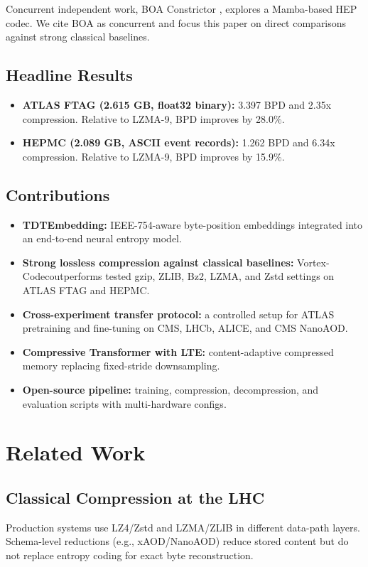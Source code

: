\documentclass[10pt,twocolumn]{article}
\newcommand{\codec}{Vortex-Codec}
\begin{document}
Concurrent independent work, BOA Constrictor \cite{boa_constrictor}, explores a Mamba-based HEP codec. We cite BOA as concurrent and focus this paper on direct comparisons against strong classical baselines.

\subsection{Headline Results}
\begin{itemize}[leftmargin=1.2em,itemsep=2pt]
  \item \textbf{ATLAS FTAG (2.615 GB, float32 binary):} 3.397 BPD and 2.35x compression. Relative to LZMA-9, BPD improves by 28.0\%.
  \item \textbf{HEPMC (2.089 GB, ASCII event records):} 1.262 BPD and 6.34x compression. Relative to LZMA-9, BPD improves by 15.9\%.
\end{itemize}

\subsection{Contributions}
\begin{itemize}[leftmargin=1.2em,itemsep=2pt]
  \item \textbf{TDTEmbedding:} IEEE-754-aware byte-position embeddings integrated into an end-to-end neural entropy model.
  \item \textbf{Strong lossless compression against classical baselines:} \codec outperforms tested gzip, ZLIB, Bz2, LZMA, and Zstd settings on ATLAS FTAG and HEPMC.
  \item \textbf{Cross-experiment transfer protocol:} a controlled setup for ATLAS pretraining and fine-tuning on CMS, LHCb, ALICE, and CMS NanoAOD.
  \item \textbf{Compressive Transformer with LTE:} content-adaptive compressed memory replacing fixed-stride downsampling.
  \item \textbf{Open-source pipeline:} training, compression, decompression, and evaluation scripts with multi-hardware configs.
\end{itemize}

\section{Related Work}
\subsection{Classical Compression at the LHC}
Production systems use LZ4/Zstd and LZMA/ZLIB in different data-path layers. Schema-level reductions (e.g., xAOD/NanoAOD) reduce stored content but do not replace entropy coding for exact byte reconstruction.
\end{document}
